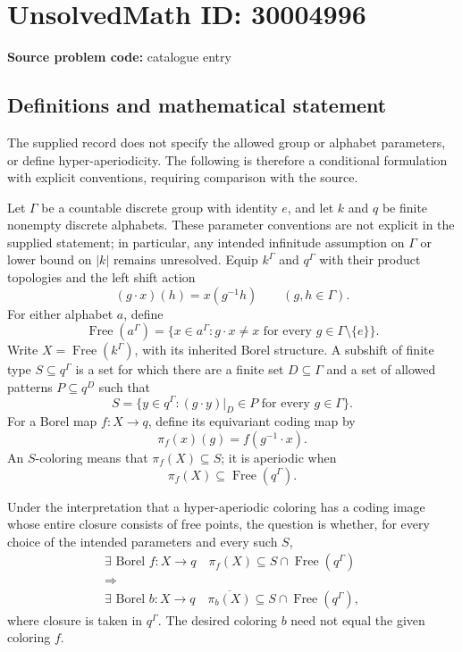 \documentclass[11pt]{article}
\begin{document}
\section*{UnsolvedMath ID: 30004996}
\textbf{Source problem code:} catalogue entry
\subsection{Definitions and mathematical statement}
The supplied record does not specify the allowed group or alphabet parameters, or define hyper-aperiodicity. The following is therefore a conditional formulation with explicit conventions, requiring comparison with the source.

Let \(\Gamma\) be a countable discrete group with identity \(e\), and let \(k\) and \(q\) be finite nonempty discrete alphabets. These parameter conventions are not explicit in the supplied statement; in particular, any intended infinitude assumption on \(\Gamma\) or lower bound on \(|k|\) remains unresolved. Equip \(k^\Gamma\) and \(q^\Gamma\) with their product topologies and the left shift action
\[
(g\cdot x)(h)=x(g^{-1}h)\qquad(g,h\in\Gamma).
\]
For either alphabet \(a\), define
\[
\operatorname{Free}(a^\Gamma)=\{x\in a^\Gamma: g\cdot x\ne x\text{ for every }g\in\Gamma\setminus\{e\}\}.
\]
Write \(X=\operatorname{Free}(k^\Gamma)\), with its inherited Borel structure. A subshift of finite type \(S\subseteq q^\Gamma\) is a set for which there are a finite set \(D\subseteq\Gamma\) and a set of allowed patterns \(P\subseteq q^D\) such that
\[
S=\{y\in q^\Gamma:(g\cdot y)|_D\in P\text{ for every }g\in\Gamma\}.
\]
For a Borel map \(f:X\to q\), define its equivariant coding map by
\[
\pi_f(x)(g)=f(g^{-1}\cdot x).
\]
An \(S\)-coloring means that \(\pi_f(X)\subseteq S\); it is aperiodic when
\[
\pi_f(X)\subseteq\operatorname{Free}(q^\Gamma).
\]

Under the interpretation that a hyper-aperiodic coloring has a coding image whose entire closure consists of free points, the question is whether, for every choice of the intended parameters and every such \(S\),
\[
\begin{gathered}
\exists\text{ Borel }f:X\to q\quad
\pi_f(X)\subseteq S\cap\operatorname{Free}(q^\Gamma)
\\[2pt]
\Longrightarrow
\\[2pt]
\exists\text{ Borel }b:X\to q\quad
\overline{\pi_b(X)}\subseteq S\cap\operatorname{Free}(q^\Gamma),
\end{gathered}
\]
where closure is taken in \(q^\Gamma\). The desired coloring \(b\) need not equal the given coloring \(f\).
\end{document}
